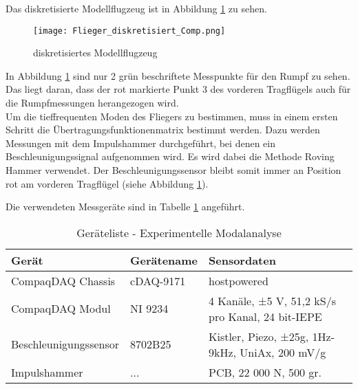    \noindent
    Das diskretisierte Modellflugzeug ist in Abbildung
    \ref{fig: Flieger_diskretisiert} zu sehen.

    \begin{figure}[H]
        \centering
        \texttt{[image: Flieger\_diskretisiert\_Comp.png]}
        \caption{diskretisiertes Modellflugzeug}
        \label{fig: Flieger_diskretisiert}
    \end{figure}

    \noindent
    In Abbildung \ref{fig: Flieger_diskretisiert} sind nur 2 grün beschriftete
    Messpunkte für den Rumpf zu sehen. Das liegt daran, dass der rot markierte
    Punkt 3 des vorderen Tragflügels auch für die Rumpfmessungen herangezogen
    wird.
    \\

    \noindent
    Um die tieffrequenten Moden des Fliegers zu bestimmen, muss in einem ersten
    Schritt die Übertragungsfunktionenmatrix bestimmt werden. Dazu werden
    Messungen mit dem Impulshammer durchgeführt, bei denen ein
    Beschleunigungssignal aufgenommen wird. Es wird dabei die Methode Roving
    Hammer verwendet. Der Beschleunigungssensor bleibt somit immer an Position
     rot\grqq \hspace{0.05cm} am vorderen Tragflügel (siehe Abbildung
    \ref{fig: Flieger_diskretisiert}).

    \noindent
    Die verwendeten Messgeräte sind in Tabelle \ref{tab: Geräteliste_EMA}
    angeführt.

    \begin{table}[H]
        \centering
        \begin{tabular}{|l|l|p{6cm}|}
            \hline
            \textbf{Gerät}  &   \textbf{Gerätename}   &   \textbf{Sensordaten} \\
            \hline \hline
            CompaqDAQ Chassis & cDAQ-9171 & hostpowered \\
            \hline
            CompaqDAQ Modul & NI 9234 & 4 Kanäle, ±5 V, 51,2 kS/s pro Kanal, 24 bit-IEPE  \\
            \hline
            Beschleunigungssensor & 8702B25 & Kistler, Piezo, ±25g, 1Hz-9kHz, UniAx, 200 mV/g  \\
            \hline
            Impulshammer & ... & PCB, 22 000 N, 500 gr.  \\
            \hline
        \end{tabular}
        \caption{Geräteliste - Experimentelle Modalanalyse}
        \label{tab: Geräteliste_EMA}
    \end{table}    

